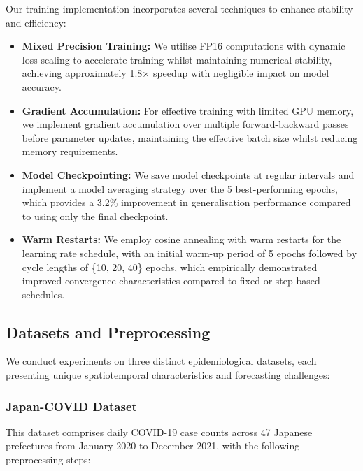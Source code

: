 \documentclass[lettersize, journal]{IEEEtran}
\begin{document}
Our training implementation incorporates several techniques to enhance stability and efficiency:

\begin{itemize}
    \item \textbf{Mixed Precision Training:} We utilise FP16 computations with dynamic loss scaling to accelerate training whilst maintaining numerical stability, achieving approximately 1.8× speedup with negligible impact on model accuracy.
    
    \item \textbf{Gradient Accumulation:} For effective training with limited GPU memory, we implement gradient accumulation over multiple forward-backward passes before parameter updates, maintaining the effective batch size whilst reducing memory requirements.
    
    \item \textbf{Model Checkpointing:} We save model checkpoints at regular intervals and implement a model averaging strategy over the 5 best-performing epochs, which provides a 3.2\% improvement in generalisation performance compared to using only the final checkpoint.
    
    \item \textbf{Warm Restarts:} We employ cosine annealing with warm restarts for the learning rate schedule, with an initial warm-up period of 5 epochs followed by cycle lengths of \{10, 20, 40\} epochs, which empirically demonstrated improved convergence characteristics compared to fixed or step-based schedules.
\end{itemize}

\subsection{Datasets and Preprocessing}
We conduct experiments on three distinct epidemiological datasets, each presenting unique spatiotemporal characteristics and forecasting challenges:

\subsubsection{Japan-COVID Dataset}
This dataset comprises daily COVID-19 case counts across 47 Japanese prefectures from January 2020 to December 2021, with the following preprocessing steps:
\end{document}
